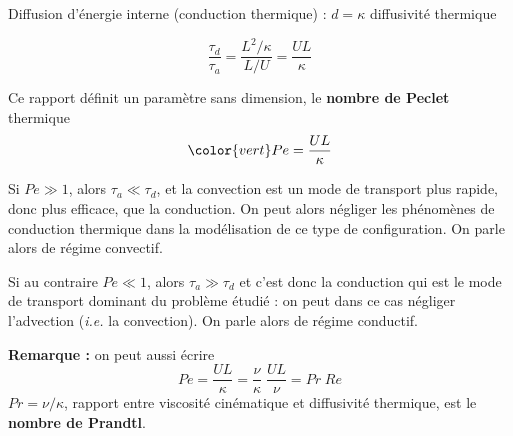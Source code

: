 {\begin{frame}{\insertsubsubsectionhead}
Diffusion d'énergie interne (conduction thermique) : $d=\kappa$ diffusivité thermique

\[
	\frac{\tau_d}{\tau_a} = \frac{L^2/\kappa}{L/U} = \frac{UL}{\kappa} 
\]


\medskip

Ce rapport définit un paramètre sans dimension, le \textbf{nombre de Peclet} thermique 
$$\color{vert} Pe = \frac{UL}{\kappa}$$

\smallskip
Si \textcolor{rouge}{$Pe\gg1$}, alors $\tau_a\ll\tau_d$, et la convection
est un mode de transport plus rapide, donc plus efficace, que la conduction.
On peut alors négliger les phénomènes de conduction thermique dans la modélisation de ce type de configuration.
On parle alors de régime \textcolor{rouge}{convectif}.

\smallskip
Si au contraire \textcolor{rouge}{$Pe \ll1$}, alors $\tau_a\gg\tau_d$ et c'est donc la conduction qui est le mode de transport
dominant du problème étudié : on peut dans ce cas négliger l'advection (\textit{i.e.} la convection).
On parle alors de régime \textcolor{rouge}{conductif}.

\bigskip

\textbf{Remarque :} on peut aussi écrire
\[
	Pe = \frac{UL}{\kappa} = \frac{\nu}{\kappa} \; \frac{UL}{\nu} = Pr \; Re
\]
$Pr = \nu/\kappa$, rapport entre viscosité cinématique et diffusivité thermique, est le \textbf{nombre de Prandtl}.

\vspace{0mm}

\end{frame}

}


